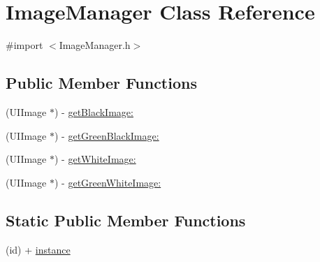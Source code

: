 \hypertarget{interface_image_manager}{
\section{ImageManager Class Reference}
\label{interface_image_manager}
}


{\ttfamily \#import $<$ImageManager.h$>$}

\subsection*{Public Member Functions}
\begin{DoxyCompactItemize}
\item 
(UIImage $\ast$) -\/ \hyperlink{interface_image_manager_ab03bf41b90ab0416e15949a90068533f}{getBlackImage:}
\item 
(UIImage $\ast$) -\/ \hyperlink{interface_image_manager_a822e853d301f90cc7382198cc2c4ea3a}{getGreenBlackImage:}
\item 
(UIImage $\ast$) -\/ \hyperlink{interface_image_manager_a20779aa491f4089e6b8badb1947a2ebc}{getWhiteImage:}
\item 
(UIImage $\ast$) -\/ \hyperlink{interface_image_manager_aa80cd9fb2fef506df8903ce3c268975b}{getGreenWhiteImage:}
\end{DoxyCompactItemize}
\subsection*{Static Public Member Functions}
\begin{DoxyCompactItemize}
\item 
(id) + \hyperlink{interface_image_manager_a5524fef52e54362f9f29b2a33e79c529}{instance}
\end{DoxyCompactItemize}
